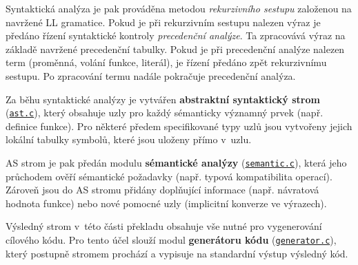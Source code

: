 \documentclass[a4paper, 11pt]{article}
\begin{document}
    Syntaktická analýza je pak prováděna metodou \emph{rekurzivního sestupu} založenou na navržené LL gramatice.
    Pokud je při rekurzivním sestupu nalezen výraz je předáno řízení syntaktické kontroly \emph{precedenční analýze}.
    Ta zpracovává výraz na základě navržené precedenční tabulky. Pokud je při precedenční analýze nalezen term
    (proměnná, volání funkce, literál), je řízení předáno zpět rekurzivnímu sestupu. Po zpracování termu nadále
    pokračuje precedenční analýza.

    Za běhu syntaktické analýzy je vytvářen
    \textbf{abstraktní syntaktický strom} (\hyperref[module:ast]{\texttt{ast.c}}),
    který obsahuje uzly pro
    každý sémanticky významný prvek (např. definice funkce). Pro některé předem specifikované typy uzlů
    jsou vytvořeny jejich lokální tabulky symbolů, které jsou uloženy přímo v~uzlu.

    AS strom je pak předán modulu \textbf{sémantické analýzy} (\hyperref[module:semantic]{\texttt{semantic.c}}),
    která jeho průchodem ověří sémantické požadavky (např. typová kompatibilita operací). Zároveň jsou do AS stromu
    přidány doplňující informace (např. návratová hodnota funkce) nebo
    nové pomocné uzly (implicitní konverze ve výrazech).

    Výsledný strom v~této části překladu  obsahuje vše nutné pro vygenerování cílového kódu. Pro tento
    účel slouží modul \textbf{generátoru kódu} (\hyperref[module:generator]{\texttt{generator.c}}), který postupně
    stromem prochází a vypisuje na standardní výstup výsledný kód.

    \medskip \medskip
\end{document}
